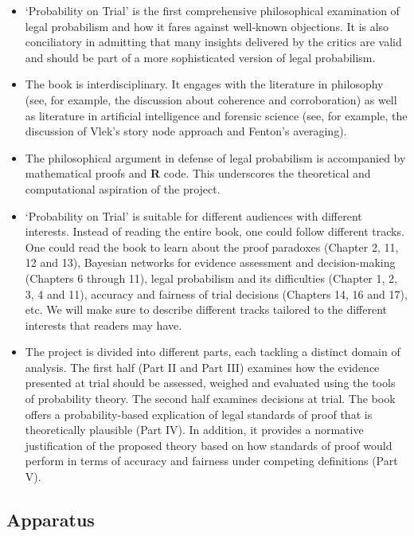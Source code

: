 \documentclass[
  10pt,
  dvipsnames,enabledeprecatedfontcommands]{scrartcl}
\begin{document}
\begin{itemize}
\item
  `Probability on Trial' is the first comprehensive philosophical
  examination of legal probabilism and how it fares against well-known
  objections. It is also conciliatory in admitting that many insights
  delivered by the critics are valid and should be part of a more
  sophisticated version of legal probabilism.
\item
  The book is interdisciplinary. It engages with the literature in
  philosophy (see, for example, the discussion about coherence and
  corroboration) as well as literature in artificial intelligence and
  forensic science (see, for example, the discussion of Vlek's story
  node approach and Fenton's averaging).
\item
  The philosophical argument in defense of legal probabilism is
  accompanied by mathematical proofs and \textbf{\textsf{R}} code. This
  underscores the theoretical and computational aspiration of the
  project.
\item
  `Probability on Trial' is suitable for different audiences with
  different interests. Instead of reading the entire book, one could
  follow different tracks. One could read the book to learn about the
  proof paradoxes (Chapter 2, 11, 12 and 13), Bayesian networks for
  evidence assessment and decision-making (Chapters 6 through 11), legal
  probabilism and its difficulties (Chapter 1, 2, 3, 4 and 11), accuracy
  and fairness of trial decisions (Chapters 14, 16 and 17), etc. We will
  make sure to describe different tracks tailored to the different
  interests that readers may have.
\item
  The project is divided into different parts, each tackling a distinct
  domain of analysis. The first half (Part II and Part III) examines how
  the evidence presented at trial should be assessed, weighed and
  evaluated using the tools of probability theory. The second half
  examines decisions at trial. The book offers a probability-based
  explication of legal standards of proof that is theoretically
  plausible (Part IV). In addition, it provides a normative
  justification of the proposed theory based on how standards of proof
  would perform in terms of accuracy and fairness under competing
  definitions (Part V).
\end{itemize}

\hypertarget{apparatus}{%
\subsection{Apparatus}\label{apparatus}}
\end{document}
